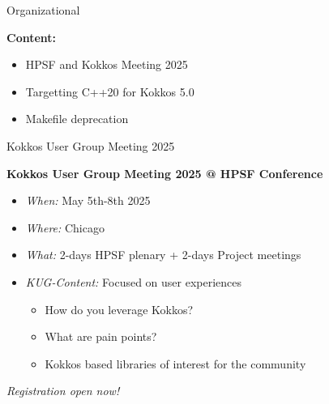 

\begin{frame}[fragile]

  {\Huge Organizational}

  \vspace{10pt}

  \textbf{Content:}
  \begin{itemize}
    \item HPSF and Kokkos Meeting 2025
    \item Targetting C++20 for Kokkos 5.0
    \item Makefile deprecation
  \end{itemize}

\end{frame}


\begin{frame}[fragile]{Kokkos User Group Meeting 2025}
\begin{center}
\textbf{Kokkos User Group Meeting 2025 @ HPSF Conference}
\end{center}

\begin{itemize}
\item{\textit{When:} May 5th-8th 2025}
\item{\textit{Where:} Chicago}
\item{\textit{What:} 2-days HPSF plenary + 2-days Project meetings}
\item{\textit{KUG-Content:} Focused on user experiences
\begin{itemize}
   \item{How do you leverage Kokkos?}
   \item{What are pain points?}
   \item{Kokkos based libraries of interest for the community}
\end{itemize}
}
\end{itemize}


\vspace{10pt}

\begin{center}
\textit{Registration open now!}
\end{center}
\end{frame}


